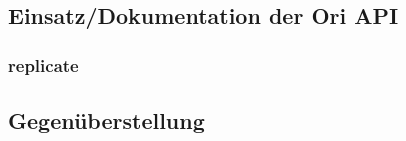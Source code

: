 \subsection{Einsatz/Dokumentation der Ori API}
\label{subsec:Einsatz/Dokumentation der Ori API}

\subsubsection{replicate}
\label{subsubsec:replicate}

\subsection{Gegenüberstellung}
\label{subsec:Gegenüberstellung}

%
%
%
